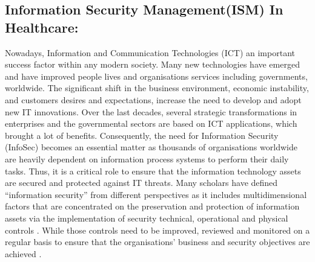 
\subsection{Information Security Management(ISM) In Healthcare:}
Nowadays, Information and Communication Technologies (ICT) an important success factor within any modern society. Many new technologies have emerged and have improved people lives and organisations services including governments, worldwide. The significant shift in the business environment, economic instability, and customers desires and expectations, increase the need to develop and adopt new IT innovations. Over the last decades, several strategic transformations in enterprises and the governmental sectors are based on ICT applications, which brought a lot of benefits. Consequently, the need for Information Security (InfoSec) becomes an essential matter as thousands of organisations worldwide are heavily dependent on information process systems to perform their daily tasks. Thus, it is a critical role to ensure that the information technology assets are secured and protected against IT threats. Many scholars have defined “information security” from different perspectives as it includes multidimensional factors that are concentrated on the preservation and protection of information assets via the implementation of security technical, operational and physical controls \cite{Hamid2014,Posthumus2004}. While those controls need to be improved, reviewed and monitored on a regular basis to ensure that the organisations’ business and security objectives are achieved \cite{ISO/IEC2014}.\\

